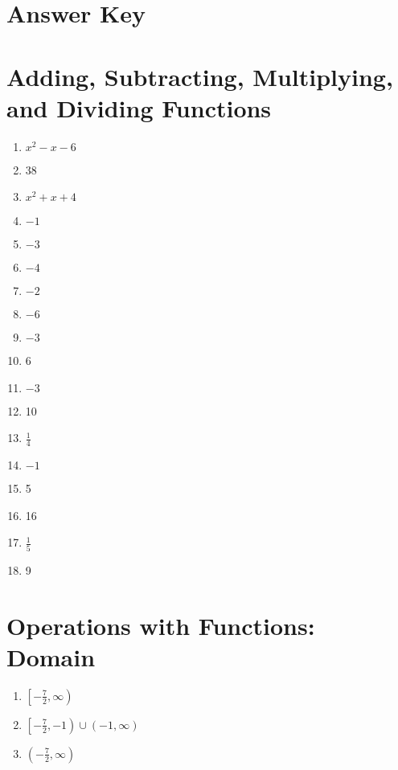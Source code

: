 \newpage


\section{Answer Key}

\section*{Adding, Subtracting, Multiplying, and Dividing Functions}

\begin{multicols}{2}
\begin{enumerate}
    \item $x^2-x-6$
    \item 38
    \item $x^2+x+4$
    \item $-1$
     \item $-3$
     \item $-4$
     \item $-2$
     \item $-6$
     \item $-3$
    \item 6
    \item $-3$
    \item 10
    \item $\frac{1}{4}$
    \item $-1$
    \item 5
    \item 16
    \item $\frac{1}{5}$
    \item 9
\end{enumerate}
\end{multicols}

\section*{Operations with Functions: Domain}
\begin{enumerate}
	\item $\left[-\frac{7}{2}, \infty\right)$
    \item $\left[-\frac{7}{2}, -1\right) \cup (-1, \infty)$
    \item $\left(-\frac{7}{2}, \infty\right)$
\end{enumerate}

